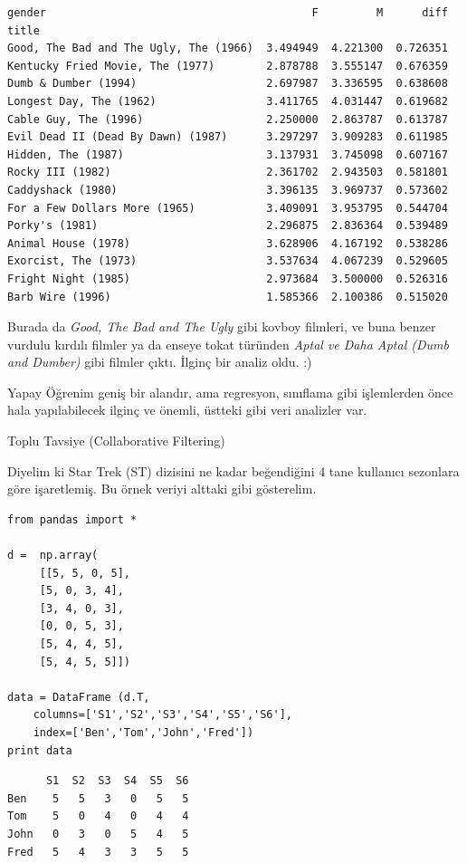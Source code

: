 \documentclass[12pt,fleqn]{article}\usepackage{../../common}
\begin{document}
\begin{verbatim}
gender                                         F         M      diff
title                                                               
Good, The Bad and The Ugly, The (1966)  3.494949  4.221300  0.726351
Kentucky Fried Movie, The (1977)        2.878788  3.555147  0.676359
Dumb & Dumber (1994)                    2.697987  3.336595  0.638608
Longest Day, The (1962)                 3.411765  4.031447  0.619682
Cable Guy, The (1996)                   2.250000  2.863787  0.613787
Evil Dead II (Dead By Dawn) (1987)      3.297297  3.909283  0.611985
Hidden, The (1987)                      3.137931  3.745098  0.607167
Rocky III (1982)                        2.361702  2.943503  0.581801
Caddyshack (1980)                       3.396135  3.969737  0.573602
For a Few Dollars More (1965)           3.409091  3.953795  0.544704
Porky's (1981)                          2.296875  2.836364  0.539489
Animal House (1978)                     3.628906  4.167192  0.538286
Exorcist, The (1973)                    3.537634  4.067239  0.529605
Fright Night (1985)                     2.973684  3.500000  0.526316
Barb Wire (1996)                        1.585366  2.100386  0.515020
\end{verbatim}

Burada da {\em Good, The Bad and The Ugly} gibi kovboy filmleri, ve buna
benzer vurdulu kırdılı filmler ya da enseye tokat türünden 
{\em Aptal ve Daha Aptal (Dumb and Dumber)} gibi filmler çıktı. İlginç 
bir analiz oldu. :)

Yapay Öğrenim geniş bir alandır, ama regresyon, sınıflama gibi işlemlerden
önce hala yapılabilecek ilginç ve önemli, üstteki gibi veri analizler var.

Toplu Tavsiye (Collaborative Filtering) 

Diyelim ki Star Trek (ST) dizisini ne kadar beğendiğini 4 tane
kullanıcı sezonlara göre işaretlemiş. Bu örnek veriyi alttaki gibi
gösterelim.

\begin{verbatim}
from pandas import *

d =  np.array(
     [[5, 5, 0, 5],
     [5, 0, 3, 4],
     [3, 4, 0, 3],
     [0, 0, 5, 3],
     [5, 4, 4, 5],
     [5, 4, 5, 5]])

data = DataFrame (d.T,
    columns=['S1','S2','S3','S4','S5','S6'],
    index=['Ben','Tom','John','Fred'])
print data
\end{verbatim}

\begin{verbatim}
      S1  S2  S3  S4  S5  S6
Ben    5   5   3   0   5   5
Tom    5   0   4   0   4   4
John   0   3   0   5   4   5
Fred   5   4   3   3   5   5
\end{verbatim}
\end{document}

